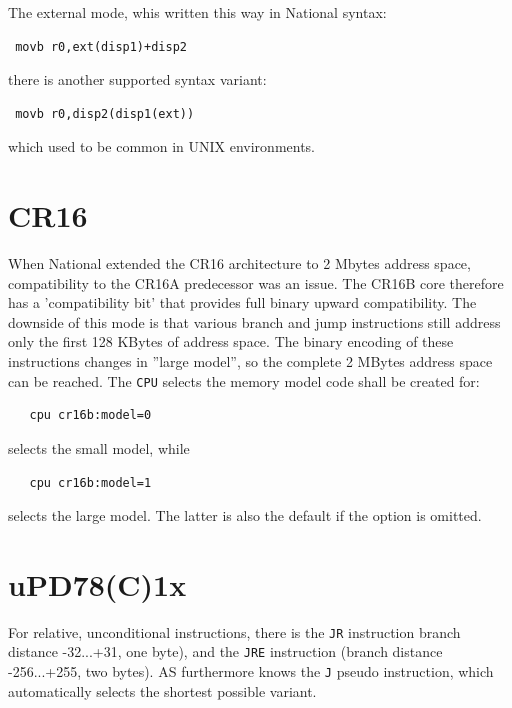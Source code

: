 \documentclass[12pt,twoside]{report}
\newcommand{\tty}[1]{{\tt #1}}
\newcommand{\asname}{{AS}}
\begin{document}
The external mode, whis written this way in National syntax:
\begin{verbatim}
 movb r0,ext(disp1)+disp2
\end{verbatim}
there is another supported syntax variant:
\begin{verbatim}
 movb r0,disp2(disp1(ext))
\end{verbatim}
which used to be common in UNIX environments.


\section{CR16}
\label{CR16Spec}

When National extended the CR16 architecture to 2 Mbytes address space,
compatibility to the CR16A predecessor was an issue.  The CR16B core therefore
has a 'compatibility bit' that provides full binary upward compatibility.  The
downside of this mode is that various branch and jump instructions still address
only the first 128 KBytes of address space.  The binary encoding of these
instructions changes in ''large model'', so the complete 2 MBytes address space
can be reached.  The \tty{CPU} selects the memory model code shall be created
for:

\begin{verbatim}
   cpu cr16b:model=0
\end{verbatim}

selects the small model, while

\begin{verbatim}
   cpu cr16b:model=1
\end{verbatim}

selects the large model.  The latter is also the default if the option is omitted.


\section{uPD78(C)1x}
\label{78C1xSpec}

For relative, unconditional instructions, there is the \tty{JR} instruction
branch distance -32...+31, one byte), and the \tty{JRE} instruction (branch
distance -256...+255, two bytes).  \asname{} furthermore knows the \tty{J} pseudo
instruction, which automatically selects the shortest possible variant.
\end{document}
